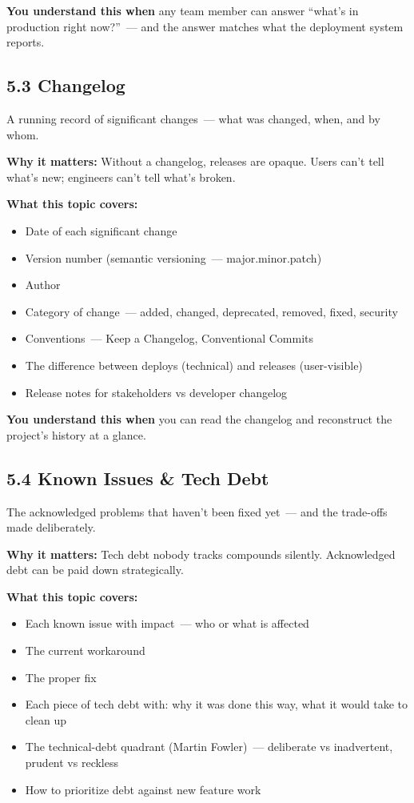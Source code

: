 \noindent{}\textbf{You understand this when} any team member can answer ``what's in production right now?''~--- and the answer matches what the deployment system reports.

\subsection*{5.3 Changelog}\label{project-planning-guide:53-changelog}

A running record of significant changes~--- what was changed, when, and by whom.

\textbf{Why it matters:} Without a changelog, releases are opaque. Users can't tell what's new; engineers can't tell what's broken.

\textbf{What this topic covers:}

\begin{itemize}
\tightlist
\item
  Date of each significant change
\item
  Version number (semantic versioning~--- major.minor.patch)
\item
  Author
\item
  Category of change~--- added, changed, deprecated, removed, fixed, security
\item
  Conventions~--- Keep a Changelog, Conventional Commits
\item
  The difference between deploys (technical) and releases (user-visible)
\item
  Release notes for stakeholders vs developer changelog
\end{itemize}

\noindent{}\textbf{You understand this when} you can read the changelog and reconstruct the project's history at a glance.

\subsection*{5.4 Known Issues \& Tech Debt}\label{project-planning-guide:54-known-issues--tech-debt}

The acknowledged problems that haven't been fixed yet~--- and the trade-offs made deliberately.

\textbf{Why it matters:} Tech debt nobody tracks compounds silently. Acknowledged debt can be paid down strategically.

\textbf{What this topic covers:}

\begin{itemize}
\tightlist
\item
  Each known issue with impact~--- who or what is affected
\item
  The current workaround
\item
  The proper fix
\item
  Each piece of tech debt with: why it was done this way, what it would take to clean up
\item
  The technical-debt quadrant (Martin Fowler)~--- deliberate vs inadvertent, prudent vs reckless
\item
  How to prioritize debt against new feature work
\end{itemize}

